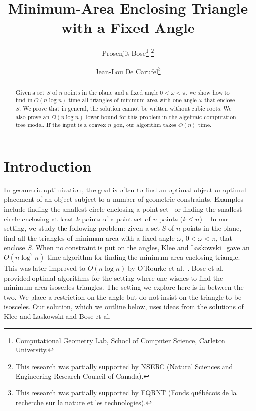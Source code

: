 \documentclass[11pt, oneside]{article}
\newcommand*\samethanks[1][\value{footnote}]{\footnotemark[#1]}
\begin{document}
\newtheorem{problem}{Problem}
\newtheorem{definition}[problem]{Definition}
\newtheorem{proposition}[problem]{Proposition}
\newtheorem{corollary}[problem]{Corollary}
\newtheorem{remark}[problem]{Remark}
\newtheorem{lemma}[problem]{Lemma}
\newtheorem{algorithm}[problem]{Algorithm}




\title{Minimum-Area Enclosing Triangle with a Fixed Angle}
\author{Prosenjit Bose\thanks{Computational Geometry Lab, School of Computer Science, Carleton University.} \thanks{This research was partially supported by NSERC (Natural Sciences and Engineering
Research Council of Canada).}
\and Jean-Lou De Carufel\samethanks[1] \thanks{This research was partially supported by FQRNT (Fonds qu\'{e}b\'{e}cois de la recherche sur la
nature et les technologies).} }


\maketitle

\begin{abstract}
Given a set $S$ of $n$ points in the plane and a fixed angle $0<\omega<\pi$, 
we show how to find in $O(n \log n)$ time
all triangles of minimum area with one angle $\omega$ 
that enclose $S$.
We prove that in general,
the solution cannot be written without cubic roots.
We also prove an $\Omega(n \log n)$ lower bound for this problem
in the algebraic computation tree model.
If the input is a convex $n$-gon,
our algorithm takes $\Theta(n)$ time.
\end{abstract}




\section{Introduction}
\label{section introduction}


In geometric optimization, 
the goal is often to find an optimal object 
or optimal placement of an object 
subject to a number of geometric constraints.
Examples include finding the smallest circle 
enclosing a point set~\cite{DBLP:journals/siamcomp/Megiddo83a,Welzl91smallestenclosing}
or finding the smallest circle
enclosing at least $k$ points of a point set of $n$ points
($k\leq n$)~\cite{DBLP:journals/comgeo/EfratSZ94,DBLP:journals/ipl/Matousek95}.
In our setting, 
we study the following problem: 
given a set $S$ of $n$ points in the plane, 
find all the triangles of minimum area 
with a fixed angle $\omega$, 
$0<\omega<\pi$, 
that enclose $S$.
When no constraint is put on the angles,
Klee and Laskowski~\cite{DBLP:journals/jal/KleeL85} 
gave an $O(n \log^2 n)$ time algorithm 
for finding the minimum-area enclosing triangle. 
This was later improved to $O(n\log n)$ 
by O'Rourke et al.~\cite{DBLP:journals/jal/ORourkeAMB86}.
Bose et al.~\cite{DBLP:journals/ijcga/BoseMSS11} 
provided optimal algorithms for the setting where 
one wishes to find the minimum-area isosceles triangles. 
The setting we explore here is in between the two. 
We place a restriction on the angle 
but do not insist on the triangle to be isosceles. 
Our solution, 
which we outline below,
uses ideas from the solutions of Klee and Laskowski
and Bose et al.
\end{document}
